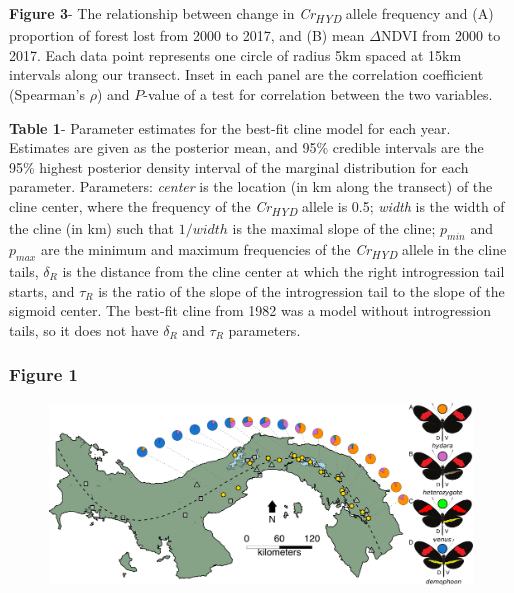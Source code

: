 \documentclass[]{article}
\begin{document}
\textbf{Figure 3}- The relationship between change in
\textit{Cr\textsubscript{HYD}} allele frequency and (A) proportion of
forest lost from 2000 to 2017, and (B) mean \(\Delta\)NDVI from 2000 to
2017. Each data point represents one circle of radius 5km spaced at 15km
intervals along our transect. Inset in each panel are the correlation
coefficient (Spearman's \(\rho\)) and \(P\)-value of a test for
correlation between the two variables.

\textbf{Table 1}- Parameter estimates for the best-fit cline model for
each year. Estimates are given as the posterior mean, and 95\% credible
intervals are the 95\% highest posterior density interval of the
marginal distribution for each parameter. Parameters: \textit{center} is
the location (in km along the transect) of the cline center, where the
frequency of the \textit{Cr\textsubscript{HYD}} allele is 0.5;
\textit{width} is the width of the cline (in km) such that \(1/width\)
is the maximal slope of the cline; \(p_{min}\) and \(p_{max}\) are the
minimum and maximum frequencies of the \textit{Cr\textsubscript{HYD}}
allele in the cline tails, \(\delta_{R}\) is the distance from the cline
center at which the right introgression tail starts, and \(\tau_{R}\) is
the ratio of the slope of the introgression tail to the slope of the
sigmoid center. The best-fit cline from 1982 was a model without
introgression tails, so it does not have \(\delta_{R}\) and \(\tau_{R}\)
parameters.

\pagebreak

\subsubsection{Figure 1}\label{figure-1}

\begin{figure}[h]
\includegraphics{figure_1_final}
\end{figure}

\pagebreak
\end{document}
